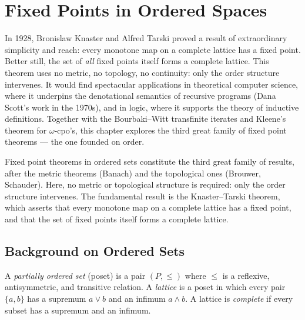 \chapter{Fixed Points in Ordered Spaces}
\label{ch:ordered}

In 1928, Bronislaw Knaster and Alfred Tarski proved a result of extraordinary simplicity and reach: every monotone map on a complete lattice has a fixed point. Better still, the set of \emph{all} fixed points itself forms a complete lattice. This theorem uses no metric, no topology, no continuity: only the order structure intervenes. It would find spectacular applications in theoretical computer science, where it underpins the denotational semantics of recursive programs (Dana Scott's work in the 1970s), and in logic, where it supports the theory of inductive definitions. Together with the Bourbaki--Witt transfinite iterates and Kleene's theorem for $\omega$-cpo's, this chapter explores the third great family of fixed point theorems --- the one founded on order.

\begin{intuition}
Fixed point theorems in ordered sets constitute the third great family of results, after
the metric theorems (Banach) and the topological ones (Brouwer, Schauder). Here, no metric
or topological structure is required: only the order structure intervenes. The fundamental
result is the Knaster--Tarski theorem, which asserts that every monotone map on a complete
lattice has a fixed point, and that the set of fixed points itself forms a complete lattice.
\end{intuition}

\section{Background on Ordered Sets}

\begin{definition}
A \emph{partially ordered set} (poset) is a pair $(P, \leq)$ where $\leq$ is a reflexive,
antisymmetric, and transitive relation. A \emph{lattice} is a poset in which every pair
$\{a, b\}$ has a supremum $a \vee b$ and an infimum $a \wedge b$. A lattice is
\emph{complete} if every subset has a supremum and an infimum.
\end{definition}

